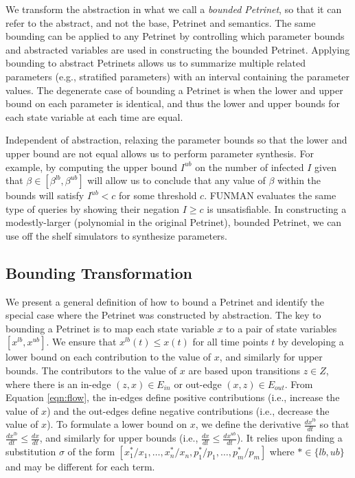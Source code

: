 We transform the abstraction in what we call a \emph{bounded Petrinet}, so that
it can refer to the abstract, and not the base, Petrinet and semantics.  The same bounding can be applied to any Petrinet by controlling which parameter bounds and abstracted variables are used in constructing the bounded Petrinet.  Applying bounding to abstract Petrinets allows us to summarize multiple related parameters (e.g., stratified parameters) with an interval containing the parameter values.  The degenerate case of bounding a Petrinet is when the lower and upper bound on each parameter is identical, and thus the lower and upper bounds for each state variable at each time are equal.  

Independent of abstraction, relaxing the parameter bounds so that the lower and upper bound are not equal allows us to perform parameter synthesis.  For example, by computing the upper bound $I^{ub}$ on the number of infected $I$ given that $\beta \in [\beta^{lb}, \beta^{ub}]$ will allow us to conclude that any value of $\beta$ within the bounds will satisfy $I^{ub} < c$ for some threshold $c$.  FUNMAN evaluates the same type of queries by showing their negation $I \geq c$ is unsatisfiable.  In constructing a modestly-larger (polynomial in the original Petrinet), bounded Petrinet, we can use off the shelf simulators to synthesize parameters.

\subsection{Bounding Transformation}

We present a general definition of how to bound a Petrinet and identify the special case where the Petrinet was constructed by abstraction.  The key to bounding a Petrinet is to map each state variable $x$ to a pair of state variables $[x^{lb}, x^{ub}]$.  We ensure that $x^{lb}(t) \leq x(t)$ for all time points $t$ by developing a lower bound on each contribution to the value of $x$, and similarly for upper bounds.  The contributors to the value of $x$ are based upon transitions $z\in Z$, where there is an in-edge $(z, x) \in E_{in}$ or out-edge $(x, z)  \in E_{out}$.  From Equation \ref{eqn:flow}, the in-edges define positive contributions (i.e., increase the value of $x$) and the out-edges define negative contributions (i.e., decrease the value of $x$).  To formulate a lower bound on $x$, we define the derivative $\frac{dx^{lb}}{dt}$ so that  $\frac{dx^{lb}}{dt} \leq \frac{dx}{dt}$, and similarly for upper bounds (i.e., $\frac{dx}{dt} \leq \frac{dx^{ub}}{dt}$).  It relies upon finding a substitution $\sigma$ of the form $[x_1^{*}/x_1, \ldots, x_n^{*}/x_n, p_1^{*}/p_1, \ldots, p_m^{*}/p_m]$ where $* \in \{lb,ub\}$ and may be different for each term.  



